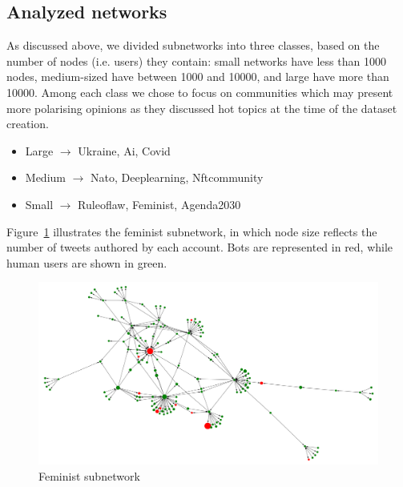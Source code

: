 \documentclass[12pt, a4paper]{article}
\begin{document}
	\subsection{Analyzed networks}
    	As discussed above, we divided subnetworks into three classes, based on the number of nodes (i.e. users) they contain: small networks have less than 1000 nodes, medium-sized have between 1000 and 10000, and large have more than 10000. Among each class we chose to focus on communities which may present more polarising opinions as they discussed hot topics at the time of the dataset creation.
    	\begin{itemize}
			\item Large $\rightarrow$ Ukraine, Ai, Covid
			\item Medium $\rightarrow$ Nato, Deeplearning, Nftcommunity
			\item Small $\rightarrow$ Ruleoflaw, Feminist, Agenda2030
		\end{itemize}
		Figure~\ref{fig:feminist_subnetwork} illustrates the feminist subnetwork, in which node size reflects the number of tweets authored by each account. Bots are represented in red, while human users are shown in green.
		\begin{figure}[H]
    		\centering
    		\includegraphics[width=\textwidth]{feminist_subnetwork.png}
    		\caption{Feminist subnetwork}
    		\label{fig:feminist_subnetwork}
		\end{figure}
		
\end{document}
